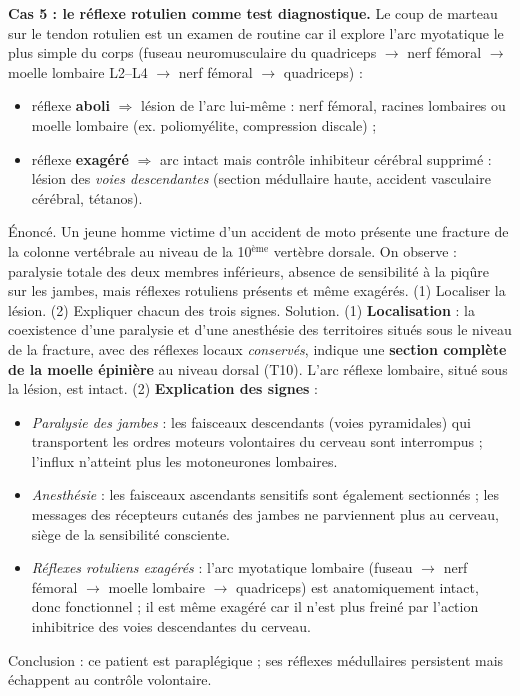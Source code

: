 \documentclass[11pt]{article}
\begin{document}
\textbf{Cas 5 : le réflexe rotulien comme test diagnostique.} Le coup de marteau sur le tendon rotulien est un examen de routine car il explore l'arc myotatique le plus simple du corps (fuseau neuromusculaire du quadriceps $\rightarrow$ nerf fémoral $\rightarrow$ moelle lombaire L2--L4 $\rightarrow$ nerf fémoral $\rightarrow$ quadriceps) :
\begin{itemize}
\item réflexe \textbf{aboli} $\Rightarrow$ lésion de l'arc lui-même : nerf fémoral, racines lombaires ou moelle lombaire (ex. poliomyélite, compression discale) ;
\item réflexe \textbf{exagéré} $\Rightarrow$ arc intact mais contrôle inhibiteur cérébral supprimé : lésion des \emph{voies descendantes} (section médullaire haute, accident vasculaire cérébral, tétanos).
\end{itemize}

\begin{exoresolu}
Énoncé. Un jeune homme victime d'un accident de moto présente une fracture de la colonne vertébrale au niveau de la 10$^{\text{ème}}$ vertèbre dorsale. On observe : paralysie totale des deux membres inférieurs, absence de sensibilité à la piqûre sur les jambes, mais réflexes rotuliens présents et même exagérés. (1) Localiser la lésion. (2) Expliquer chacun des trois signes.
\tcblower
Solution. (1) \textbf{Localisation} : la coexistence d'une paralysie et d'une anesthésie des territoires situés sous le niveau de la fracture, avec des réflexes locaux \emph{conservés}, indique une \textbf{section complète de la moelle épinière} au niveau dorsal (T10). L'arc réflexe lombaire, situé sous la lésion, est intact.
(2) \textbf{Explication des signes} :
\begin{itemize}
\item \emph{Paralysie des jambes} : les faisceaux descendants (voies pyramidales) qui transportent les ordres moteurs volontaires du cerveau sont interrompus ; l'influx n'atteint plus les motoneurones lombaires.
\item \emph{Anesthésie} : les faisceaux ascendants sensitifs sont également sectionnés ; les messages des récepteurs cutanés des jambes ne parviennent plus au cerveau, siège de la sensibilité consciente.
\item \emph{Réflexes rotuliens exagérés} : l'arc myotatique lombaire (fuseau $\rightarrow$ nerf fémoral $\rightarrow$ moelle lombaire $\rightarrow$ quadriceps) est anatomiquement intact, donc fonctionnel ; il est même exagéré car il n'est plus freiné par l'action inhibitrice des voies descendantes du cerveau.
\end{itemize}
Conclusion : ce patient est paraplégique ; ses réflexes médullaires persistent mais échappent au contrôle volontaire.
\end{exoresolu}
\end{document}
